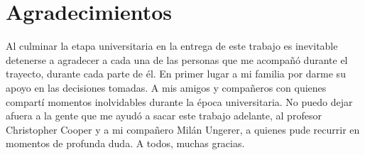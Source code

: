 \chapter*{Agradecimientos}
Al culminar la etapa universitaria en la entrega de este trabajo es inevitable detenerse a agradecer a cada una de las personas que me acompañó durante el trayecto, durante cada parte de él. En primer lugar a mi familia por darme su apoyo en las decisiones tomadas. A mis amigos y compañeros con quienes compartí momentos inolvidables durante la época universitaria. No puedo dejar afuera a la gente que me ayudó a sacar este trabajo adelante, al profesor Christopher Cooper y a mi compañero Milán Ungerer, a quienes pude recurrir en momentos de profunda duda. A todos, muchas gracias. 